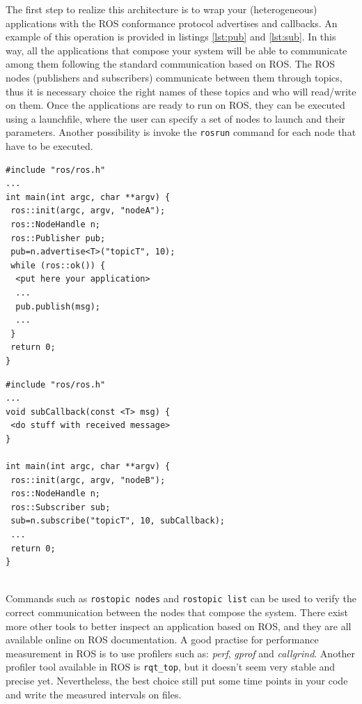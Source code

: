 The first step to realize this architecture is to wrap your (heterogeneous) applications with the ROS conformance protocol advertises and callbacks. An example of this operation is provided in listings \ref{lst:pub} and \ref{lst:sub}.
In this way, all the applications that compose your system will be able to communicate among them following the standard communication based on ROS.
The ROS nodes (publishers and subscribers) communicate between them through topics, thus it is necessary choice the right names of these topics and who will read/write on them.
Once the applications are ready to run on ROS, they can be executed using a launchfile, where the user can specify a set of nodes to launch and their parameters.
Another possibility is invoke the \texttt{rosrun} command for each node that have to be executed.


\noindent\begin{minipage}{.475\textwidth}
\begin{verbatim}
#include "ros/ros.h"
...
int main(int argc, char **argv) {
 ros::init(argc, argv, "nodeA");
 ros::NodeHandle n;
 ros::Publisher pub;
 pub=n.advertise<T>("topicT", 10);
 while (ros::ok()) {
  <put here your application>
  ...
  pub.publish(msg);
  ...
 }
 return 0;
}
\end{verbatim}
\end{minipage}\hfill
\begin{minipage}{.475\textwidth}
\begin{verbatim}
#include "ros/ros.h"
...
void subCallback(const <T> msg) {
 <do stuff with received message>
}

int main(int argc, char **argv) {
 ros::init(argc, argv, "nodeB");
 ros::NodeHandle n;
 ros::Subscriber sub;
 sub=n.subscribe("topicT", 10, subCallback);
 ...
 return 0;
}
\end{verbatim}
\end{minipage}
\\


Commands such as \texttt{rostopic nodes} and \texttt{rostopic list} can be used to verify the correct communication between the nodes that compose the system.
There exist more other tools to better inspect an application based on ROS, and they are all available online on ROS documentation.
A good practise for performance measurement in ROS is to use profilers such as: \textit{perf}, \textit{gprof} and \textit{callgrind}. Another profiler tool available in ROS is \texttt{rqt_top}, but it doesn't seem very stable and precise yet. Nevertheless, the best choice still put some time points in your code and write the measured intervals on files.



